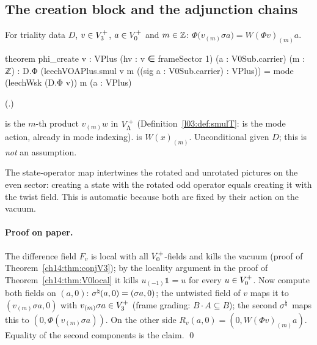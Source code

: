 \subsection{The creation block and the adjunction chains}

\begin{proposition}\label{ch14:prop:create}
For triality data $D$, $v\in V_3^{+}$, $a\in V_0^{+}$ and $m\in{\mathbb{Z}}$:
$\Phi\bigl(v_{(m)}\sigma a\bigr)=W(\Phi v)_{(m)}a$.
\end{proposition}
\begin{leancode}
theorem phi_create {v : VPlus} (hv : v ∈ frameSector 1) (a : V0Sub.carrier) (m : ℤ) :
    D.Φ (leechVOAPlus.smul v m ((sig a : V0Sub.carrier) : VPlus))
      = mode (leechWsk (D.Φ v)) m (a : VPlus)
\end{leancode}
(.)

\begin{dictionary}
 is the $m$-th product $v_{(m)}w$ in $V_{\Lambda}^+$ (Definition~\ref{l03:def:smulT}:
 is the mode action, already in mode indexing).   is
$W(x)_{(m)}$.  Unconditional given $D$; this is \emph{not} an assumption.
\end{dictionary}
\begin{physics}
The state-operator map intertwines the rotated and unrotated pictures on the even sector: creating a state with the rotated odd operator equals creating it with the twist field. This is automatic because both are fixed by their action on the vacuum.
\end{physics}


\paragraph{Proof on paper.}  The difference field $F_v$ is local with all $V_0^{+}$-fields and
kills the vacuum (proof of Theorem~\ref{ch14:thm:conjV3}); by the locality argument in the proof of
Theorem~\ref{ch14:thm:V0local} it kills $u_{(-1)}\mathbb 1=u$ for every $u\in V_0^{+}$.  Now compute
both fields on $(a,0)$: $\sigma^{\natural}(a,0)=(\sigma a,0)$; the untwisted field of $v$ maps it to
$(v_{(m)}\sigma a,0)$ with $v_{(m)}\sigma a\in V_3^{+}$ (frame grading: $B\cdot A\subseteq B$); the second
$\sigma^{\natural}$ maps this to $(0,\Phi(v_{(m)}\sigma a))$.  On the other side $R_v(a,0)=(0,W(\Phi v)_{(m)}a)$.
Equality of the second components is the claim. \qed

